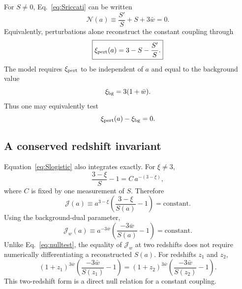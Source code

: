 \documentclass[11pt]{article}
\theoremstyle{remark}
\begin{document}
For $S\neq0$, Eq.~\eqref{eq:Sriccati} can be written
\begin{equation}
    \boxed{
    \mathcal N(a)
    \equiv
    \frac{S'}{S}+S+3\bar w
    =0.}
    \label{eq:nulltest}
\end{equation}
Equivalently, perturbations alone reconstruct the constant coupling through
\begin{equation}
    \boxed{
    \xi_{\rm pert}(a)
    =3-S-\frac{S'}{S}.}
    \label{eq:xireconstruct}
\end{equation}
The model requires $\xi_{\rm pert}$ to be independent of $a$ and equal to the background value
\begin{equation}
    \xi_{\rm bg}=3(1+\bar w).
    \label{eq:xibg}
\end{equation}
Thus one may equivalently test
\begin{equation}
    \xi_{\rm pert}(a)-\xi_{\rm bg}=0.
    \label{eq:xinull}
\end{equation}

\subsection{A conserved redshift invariant}

Equation~\eqref{eq:Slogistic} also integrates exactly.  For $\xi\neq3$,
\begin{equation}
    \frac{3-\xi}{S}-1
    =C\,a^{-(3-\xi)},
    \label{eq:Ssolutionimplicit}
\end{equation}
where $C$ is fixed by one measurement of $S$.  Therefore
\begin{equation}
    \boxed{
    \mathcal J(a)
    \equiv
    a^{3-\xi}\left(\frac{3-\xi}{S(a)}-1\right)
    =\mathrm{constant}.}
    \label{eq:Jxi}
\end{equation}
Using the background-dual parameter,
\begin{equation}
    \boxed{
    \mathcal J_w(a)
    \equiv
    a^{-3\bar w}
    \left(\frac{-3\bar w}{S(a)}-1\right)
    =\mathrm{constant}.}
    \label{eq:Jw}
\end{equation}
Unlike Eq.~\eqref{eq:nulltest}, the equality of $\mathcal J_w$ at two redshifts does not require numerically differentiating a reconstructed $S(a)$.  For redshifts $z_1$ and $z_2$,
\begin{equation}
    (1+z_1)^{3\bar w}
    \left(\frac{-3\bar w}{S(z_1)}-1\right)
    =
    (1+z_2)^{3\bar w}
    \left(\frac{-3\bar w}{S(z_2)}-1\right).
    \label{eq:twoznull}
\end{equation}
This two-redshift form is a direct null relation for a constant coupling.
\end{document}
